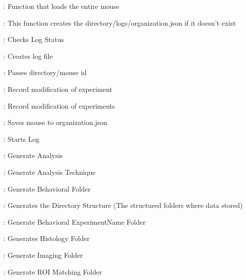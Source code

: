 \documentclass[letterpaper,10pt,english]{sphinxmanual}
\begin{document}
\begin{fulllineitems}
\begin{description}
\begin{DUlineblock}{0em}
\item[]  : Function that loads the entire mouse
\end{DUlineblock}

\begin{DUlineblock}{0em}
\item[]  : This function creates the directory/logs/organization.json if it doesn’t exist
\item[]  : Checks Log Status
\item[]  : Creates log file
\item[]  : Passes directory/mouse id
\item[]  : Record modification of experiment
\item[]  : Record modification of experiments
\item[]  : Saves mouse to organization.json
\item[]  : Starts Log
\end{DUlineblock}

\begin{DUlineblock}{0em}
\item[]  : Generate Analysis
\item[]  : Generate Analysis Technique
\item[]  : Generate Behavioral Folder
\item[]  : Generates the Directory Structure (The structured folders where data stored)
\item[]  : Generate Behavioral ExperimentName Folder
\item[]  :  Generates Histology Folder
\item[]  : Generate Imaging Folder
\item[]  : Generate ROI Matching Folder
\end{DUlineblock}


\end{description}
\end{fulllineitems}
\end{document}
